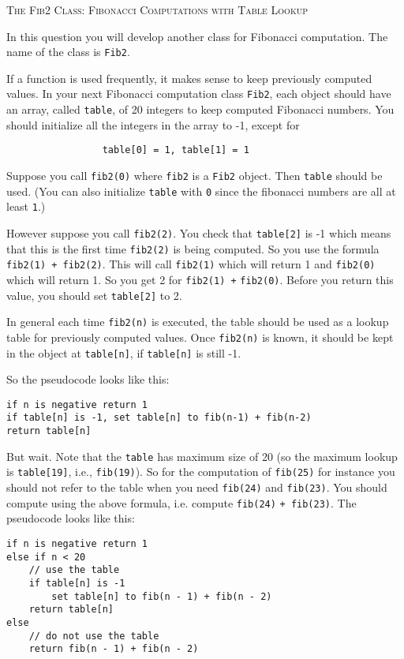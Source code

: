 \textsc{The Fib2 Class: Fibonacci Computations with Table Lookup}

In this question you will develop another class for Fibonacci computation. The name of the class is
\texttt{Fib2}.

If a function is used frequently, it makes sense to keep previously computed values. In your next
Fibonacci computation class \texttt{Fib2}, each object should have an array,
called \verb!table!, of 20 integers to
keep computed Fibonacci numbers. You should initialize all the integers in the array to -1, except for

\verb!                 table[0] = 1, table[1] = 1!

Suppose you call \verb!fib2(0)! where \verb!fib2! is a \texttt{Fib2} object.
Then \verb!table! should be used.
(You can also initialize \verb!table! with \verb!0! since the
fibonacci numbers are all at least \verb!1!.)

However suppose you call \verb!fib2(2)!. You check that \verb!table[2]! is -1 which means that this is the
first time \verb!fib2(2)! is being computed. So you use the formula \verb!fib2(1) + fib2(2)!. This will call
\verb!fib2(1)! which will return 1 and \verb!fib2(0)! which will return 1. So you get 2 for \verb!fib2(1) +!
\verb!fib2(0)!. Before you return this value, you should set \verb!table[2]! to 2.

In general each time \verb!fib2(n)! is executed, the table should be used as a lookup table for previously
computed values. Once \verb!fib2(n)! is known, it should be kept in the object at \verb!table[n]!, if \verb!table[n]!
is still -1.

So the pseudocode looks like this:

\begin{Verbatim}[frame=single]
if n is negative return 1
if table[n] is -1, set table[n] to fib(n-1) + fib(n-2)
return table[n]
\end{Verbatim}

But wait. Note that the \verb!table!
has maximum size of 20 (so the maximum lookup is \verb!table[19]!, i.e.,
\verb!fib(19)!). So for the computation of \verb!fib(25)! for instance you should not refer to the table when you
need \verb!fib(24)! and \verb!fib(23)!. You should compute using the above formula, i.e. compute \verb!fib(24)!
\verb!+ fib(23)!. The pseudocode looks like this:

\begin{Verbatim}[frame=single]
if n is negative return 1
else if n < 20
    // use the table
    if table[n] is -1
        set table[n] to fib(n - 1) + fib(n - 2)
    return table[n]
else
    // do not use the table
    return fib(n - 1) + fib(n - 2)
\end{Verbatim}

